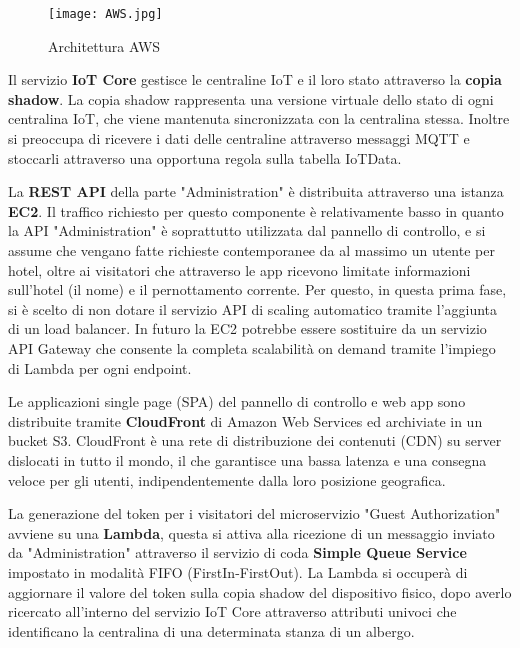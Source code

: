 \begin{figure}[H]
    \texttt{[image: AWS.jpg]}
    \centering
    \caption[aws]{Architettura AWS}
    \label{fig:aws}
\end{figure}

Il servizio \textbf{IoT Core} gestisce le centraline IoT e il loro stato attraverso la \textbf{copia shadow}. La copia shadow rappresenta una versione virtuale dello stato di ogni centralina IoT, che viene mantenuta sincronizzata con la centralina stessa. Inoltre si preoccupa di ricevere i dati delle centraline attraverso messaggi MQTT e stoccarli attraverso una opportuna regola sulla tabella IoTData.

La \textbf{REST API} della parte "Administration" è distribuita attraverso una istanza \textbf{EC2}.
Il traffico richiesto per questo componente è relativamente basso in quanto la API "Administration" è soprattutto utilizzata dal pannello di controllo, e si assume che vengano fatte richieste contemporanee da al massimo un utente per hotel, oltre ai visitatori che attraverso le app ricevono limitate informazioni sull'hotel (il nome) e il pernottamento corrente.
Per questo, in questa prima fase, si è scelto di non dotare il servizio API di scaling automatico tramite l'aggiunta di un load balancer.
In futuro la EC2 potrebbe essere sostituire da un servizio API Gateway che consente la completa scalabilità on demand tramite l'impiego di Lambda per ogni endpoint.

Le applicazioni single page (SPA) del pannello di controllo e web app sono distribuite tramite \textbf{CloudFront} di Amazon Web Services ed archiviate in un bucket S3. CloudFront è una rete di distribuzione dei contenuti (CDN) su server dislocati in tutto il mondo, il che garantisce una bassa latenza e una consegna veloce per gli utenti, indipendentemente dalla loro posizione geografica.

La generazione del token per i visitatori del microservizio "Guest Authorization" avviene su una \textbf{Lambda}, questa si attiva alla ricezione di un messaggio inviato da "Administration" attraverso il servizio di coda \textbf{Simple Queue Service} impostato in modalità FIFO (FirstIn-FirstOut). La Lambda si occuperà di aggiornare il valore del token sulla copia shadow del dispositivo fisico, dopo averlo ricercato all'interno del servizio IoT Core attraverso attributi univoci che identificano la centralina di una determinata stanza di un albergo.

